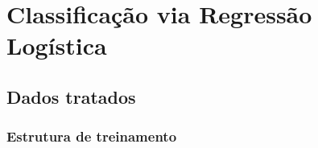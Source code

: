 
\section{Classificação via Regressão Logística}




\subsection{Dados tratados}

\subsubsection{Estrutura de treinamento}


